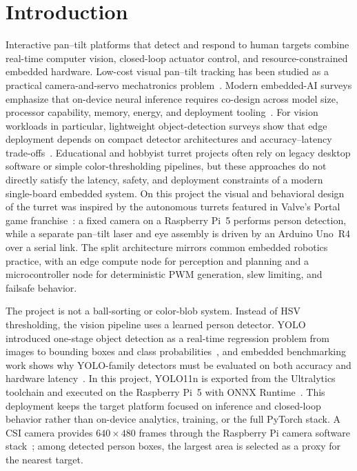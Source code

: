 \documentclass[lettersize,journal]{IEEEtran}
\begin{document}
\section{Introduction}
\label{sec:intro}
Interactive pan--tilt platforms that detect and respond to human targets combine real-time computer vision, closed-loop actuator control, and resource-constrained embedded hardware. Low-cost visual pan--tilt tracking has been studied as a practical camera-and-servo mechatronics problem~\cite{pan_tilt}. Modern embedded-AI surveys emphasize that on-device neural inference requires co-design across model size, processor capability, memory, energy, and deployment tooling~\cite{edge_ai_in_practice,CNN_LLM_Deployment,Tiny_Machine}. For vision workloads in particular, lightweight object-detection surveys show that edge deployment depends on compact detector architectures and accuracy--latency trade-offs~\cite{Lightweight_Edge_Devices}. Educational and hobbyist turret projects often rely on legacy desktop software or simple color-thresholding pipelines, but these approaches do not directly satisfy the latency, safety, and deployment constraints of a modern single-board embedded system. On this project the visual and behavioral design of the turret was inspired by the autonomous turrets featured in Valve's Portal game franchise~\cite{portal_valve}: a fixed camera on a Raspberry Pi~5 performs person detection, while a separate pan--tilt laser and eye assembly is driven by an Arduino Uno~R4 over a serial link. The split architecture mirrors common embedded robotics practice, with an edge compute node for perception and planning and a microcontroller node for deterministic PWM generation, slew limiting, and failsafe behavior.

The project is not a ball-sorting or color-blob system. Instead of HSV thresholding, the vision pipeline uses a learned person detector. YOLO introduced one-stage object detection as a real-time regression problem from images to bounding boxes and class probabilities~\cite{yolo11}, and embedded benchmarking work shows why YOLO-family detectors must be evaluated on both accuracy and hardware latency~\cite{yolo11_2}. In this project, YOLO11n is exported from the Ultralytics toolchain and executed on the Raspberry Pi~5 with ONNX Runtime~\cite{ultralytics,onnxruntime}. This deployment keeps the target platform focused on inference and closed-loop behavior rather than on-device analytics, training, or the full PyTorch stack. A CSI camera provides $640\times480$ frames through the Raspberry Pi camera software stack~\cite{picamera3}; among detected person boxes, the largest area is selected as a proxy for the nearest target.
\end{document}

